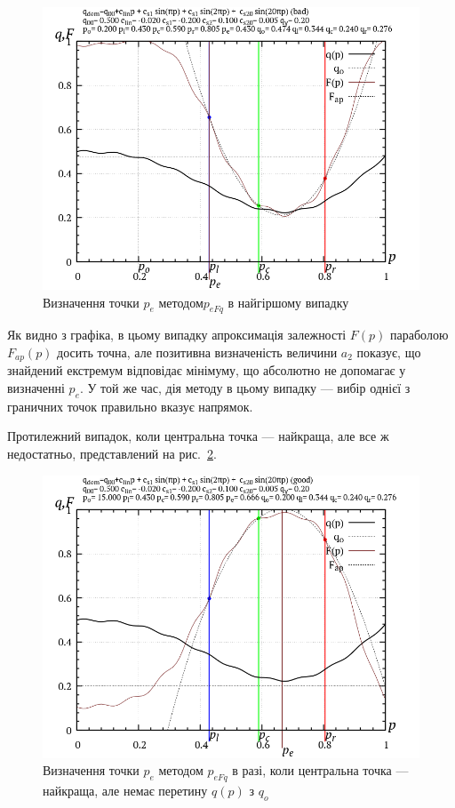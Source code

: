 \begin{figure}[htb!]
  \begin{center}
    \includegraphics[width=60\TW]{p/p_eFq/q_p_eFq_bad.png}
  \end{center}
  \caption{Визначення точки $ p_e $ методом$ p_{eFq} $ в найгіршому випадку}
  \label{atu:f:p_eFq_bad}
\end{figure}

Як видно з графіка, в цьому випадку апроксимація залежності
$ F (p) $ параболою
$ F_{ap} (p) $ досить точна, але позитивна визначеність величини
$ a_2 $ показує, що знайдений екстремум відповідає мінімуму, що
абсолютно не допомагає у визначенні
$ p_e $. У той же час, дія методу в цьому випадку --- вибір однієї з
граничних точок правильно вказує напрямок.

Протилежний випадок, коли центральна точка --- найкраща, але все
ж недостатньо, представлений на рис.~\ref{atu:f:p_eFq_good}.

\begin{figure}[htb!]
  \begin{center}
    \includegraphics[width=60\TW]{p/p_eFq/q_p_eFq_good.png}
  \end{center}
  \caption{Визначення точки $ p_e $ методом $ p_{eFq} $ в разі, коли центральна точка --- найкраща, але немає перетину $q(p)$ з $ q_o $}
  \label{atu:f:p_eFq_good}
\end{figure}


